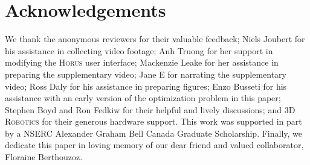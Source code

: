 
\section*{Acknowledgements}

We thank the anonymous reviewers for their valuable feedback;
Niels Joubert for his assistance in collecting video footage;
Anh Truong for her support in modifying the \textsc{Horus} user interface;
Mackenzie Leake for her assistance in preparing the supplementary video;
Jane E for narrating the supplementary video;
Ross Daly for his assistance in preparing figures;
Enzo Busseti for his assistance with an early version of the optimization problem in this paper;
Stephen Boyd and Ron Fedkiw for their helpful and lively discussions;
and \textsc{3D Robotics} for their generous hardware support.
This work was supported in part by a NSERC Alexander Graham Bell Canada Graduate Scholarship.
Finally, we dedicate this paper in loving memory of our dear friend and valued collaborator, Floraine Berthouzoz.
